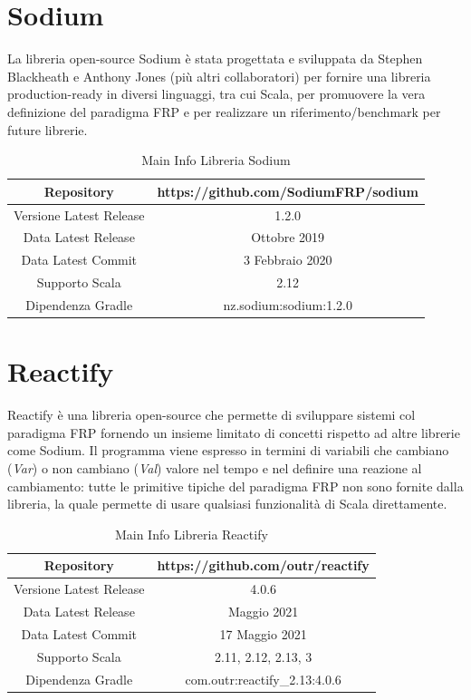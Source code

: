 \documentclass[../main.tex]{subfiles}
\begin{document}
\section{Sodium}
La libreria open-source Sodium è stata progettata e sviluppata da Stephen Blackheath e Anthony Jones (più altri collaboratori) per fornire una libreria production-ready in diversi linguaggi, tra cui Scala, per promuovere la vera definizione del paradigma FRP e per realizzare un riferimento/benchmark per future librerie.

\begin{table}[H]
\centering
\begin{tabular}{|c|c|}
     \hline
     Repository & https://github.com/SodiumFRP/sodium \\
     \hline
     Versione Latest Release & 1.2.0 \\
     \hline
     Data Latest Release & Ottobre 2019 \\
     \hline
     Data Latest Commit & 3 Febbraio 2020 \\
     \hline
     Supporto Scala & 2.12 \\
     \hline
     Dipendenza Gradle & nz.sodium:sodium:1.2.0 \\
     \hline
\end{tabular}
\caption{Main Info Libreria Sodium}
\end{table}

\section{Reactify}
Reactify è una libreria open-source che permette di sviluppare sistemi col paradigma FRP fornendo un insieme limitato di concetti rispetto ad altre librerie come Sodium. Il programma viene espresso in termini di variabili che cambiano (\textit{Var}) o non cambiano (\textit{Val}) valore nel tempo e nel definire una reazione al cambiamento: tutte le primitive tipiche del paradigma FRP non sono fornite dalla libreria, la quale permette di usare qualsiasi funzionalità di Scala direttamente.

\begin{table}[H]
\centering
\begin{tabular}{|c|c|}
     \hline
     Repository & https://github.com/outr/reactify \\
     \hline
     Versione Latest Release & 4.0.6 \\
     \hline
     Data Latest Release & Maggio 2021 \\
     \hline
     Data Latest Commit & 17 Maggio 2021 \\
     \hline
     Supporto Scala & 2.11, 2.12, 2.13, 3 \\
     \hline
     Dipendenza Gradle & com.outr:reactify\_2.13:4.0.6 \\
     \hline
\end{tabular}
\caption{Main Info Libreria Reactify}
\end{table}
\end{document}
